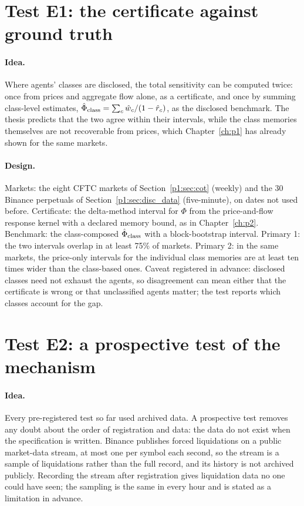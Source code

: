 \section{Test E1: the certificate against ground truth}\label{sec:ev_e1}

\paragraph{Idea.} Where agents' classes are disclosed, the total sensitivity can be computed twice: once from prices and aggregate flow alone, as a certificate, and once by summing class-level estimates, $\hat\Phi_{\rm class}=\sum_c\hat w_c/(1-\hat r_c)$, as the disclosed benchmark. The thesis predicts that the two agree within their intervals, while the class memories themselves are not recoverable from prices, which Chapter~\ref{ch:p1} has already shown for the same markets.

\paragraph{Design.} Markets: the eight CFTC markets of Section~\ref{p1:sec:cot} (weekly) and the 30 Binance perpetuals of Section~\ref{p1:sec:disc_data} (five-minute), on dates not used before. Certificate: the delta-method interval for $\Phi$ from the price-and-flow response kernel with a declared memory bound, as in Chapter~\ref{ch:p2}. Benchmark: the class-composed $\hat\Phi_{\rm class}$ with a block-bootstrap interval. Primary 1: the two intervals overlap in at least 75\% of markets. Primary 2: in the same markets, the price-only intervals for the individual class memories are at least ten times wider than the class-based ones. Caveat registered in advance: disclosed classes need not exhaust the agents, so disagreement can mean either that the certificate is wrong or that unclassified agents matter; the test reports which classes account for the gap.


\section{Test E2: a prospective test of the mechanism}\label{sec:ev_e2}

\paragraph{Idea.} Every pre-registered test so far used archived data. A prospective test removes any doubt about the order of registration and data: the data do not exist when the specification is written. Binance publishes forced liquidations on a public market-data stream, at most one per symbol each second, so the stream is a sample of liquidations rather than the full record, and its history is not archived publicly. Recording the stream after registration gives liquidation data no one could have seen; the sampling is the same in every hour and is stated as a limitation in advance.

